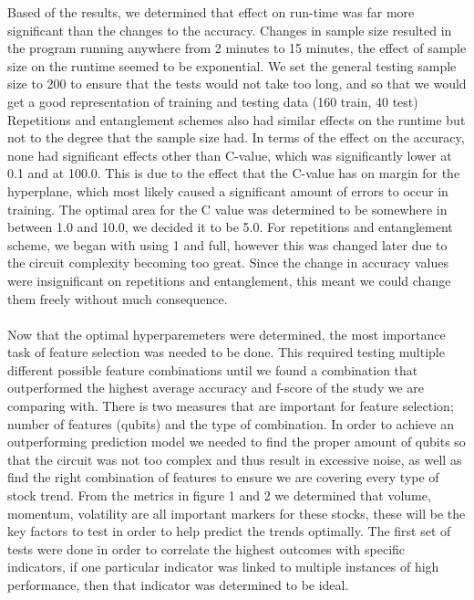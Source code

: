 \documentclass{article}
\begin{document}
\noindent
Based of the results, we determined that effect on run-time was far more significant than the changes to the accuracy. Changes in sample size resulted in the program running anywhere from 2 minutes to 15 minutes, the effect of sample size on the runtime seemed to be exponential. We set the general testing sample size to 200 to ensure that the tests would not take too long, and so that we would get a good representation of training and testing data (160 train, 40 test) Repetitions and entanglement schemes also had similar effects on the runtime but not to the degree that the sample size had. In terms of the effect on the accuracy, none had significant effects other than C-value, which was significantly lower at 0.1 and at 100.0. This is due to the effect that the C-value has on margin for the hyperplane, which most likely caused a significant amount of errors to occur in training. The optimal area for the C value was determined to be somewhere in between 1.0 and 10.0, we decided it to be 5.0. For repetitions and entanglement scheme, we began with using 1 and full, however this was changed later due to the circuit complexity becoming too great. Since the change in accuracy values were insignificant on repetitions and entanglement, this meant we could change them freely without much consequence. 
\\
\\
Now that the optimal hyperparemeters were determined, the most importance task of feature selection was needed to be done. This required testing multiple different possible feature combinations until we found a combination that outperformed the highest average accuracy and f-score of the study we are comparing with. There is two measures that are important for feature selection; number of features (qubits) and the type of combination. In order to achieve an outperforming prediction model we needed to find the proper amount of qubits so that the circuit was not too complex and thus result in excessive noise, as well as find the right combination of features to ensure we are covering every type of stock trend. From the metrics in figure 1 and 2 we determined that volume, momentum, volatility are all important markers for these stocks, these will be the key factors to test in order to help predict the trends optimally. 
The first set of tests were done in order to correlate the highest outcomes with specific indicators, if one particular indicator was linked to multiple instances of high performance, then that indicator was determined to be ideal. 
\end{document}
